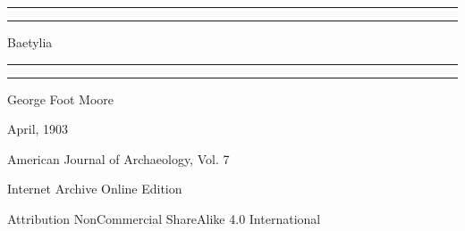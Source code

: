 \documentclass[a4paper, 12pt, oneside, polutonikogreek, english]{article}
\begin{document}
\begin{titlepage} %
	\centering %
	\scshape %

	
	\rule{\textwidth}{1.6pt}\vspace*{-\baselineskip}\vspace*{2pt} %
	\rule{\textwidth}{0.4pt} %
	
	\vspace{0.75\baselineskip} %

        {\LARGE Baetylia} %
	
	\vspace{0.75\baselineskip} %
	
	\rule{\textwidth}{0.4pt}\vspace*{-\baselineskip}\vspace{3.2pt} %
	\rule{\textwidth}{1.6pt} %
	
	\vspace{1\baselineskip} %
	
	
	{\large George Foot Moore} %
	
	\vspace*{1\baselineskip} %
	
	
	\vspace{1\baselineskip} %

	
	
		
	\vspace*{\fill}%
	
	{\small April, 1903}%
	
	{\small American Journal of Archaeology, Vol. 7} %

	\vspace{1\baselineskip} %

    Internet Archive Online Edition  %
	
	{\small Attribution NonCommercial ShareAlike 4.0 International } %
\end{titlepage}
\clearpage
\end{document}
